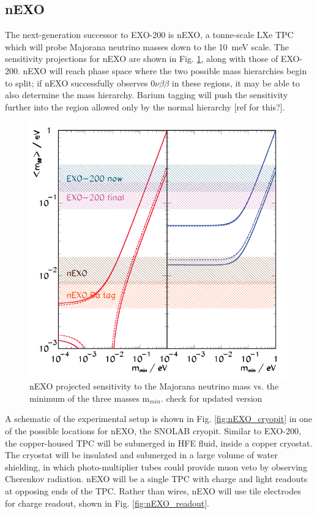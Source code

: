 \subsection{nEXO}

The next-generation successor to EXO-200 is nEXO, a tonne-scale LXe TPC which will probe Majorana neutrino masses down to the 10~meV scale.  The sensitivity projections for nEXO are shown in Fig. \ref{fig:sensitivity_nEXO}, along with those of EXO-200.  nEXO will reach phase space where the two possible mass hierarchies begin to split; if nEXO successfully observes $0\nu\beta\beta$ in these regions, it may be able to also determine the mass hierarchy.  Barium tagging will push the sensitivity further into the region allowed only by the normal hierarchy {\color{gray}[ref for this?]}.

\begin{figure}[H]
	\centering
	\includegraphics[width=.7\textwidth]{figures/sensitivity_v2.png}
	\caption{nEXO projected sensitivity to the Majorana neutrino mass vs. the minimum of the three masses m$_{min}$. {\color{red}check for updated version}}
\label{fig:sensitivity_nEXO}
\end{figure}

A schematic of the experimental setup is shown in Fig. \ref{fig:nEXO_cryopit} in one of the possible locations for nEXO, the SNOLAB cryopit.  Similar to EXO-200, the copper-housed TPC will be submerged in HFE fluid, inside a copper cryostat.  The cryostat will be insulated and submerged in a large volume of water shielding, in which photo-multiplier tubes could provide muon veto by observing Cherenkov radiation.  nEXO will be a single TPC with charge and light readouts at opposing ends of the TPC.  Rather than wires, nEXO will use tile electrodes for charge readout, shown in Fig. \ref{fig:nEXO_readout}.

